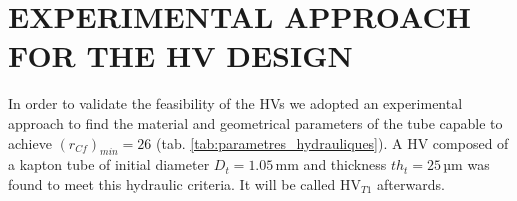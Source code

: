\documentclass[3p,twocolumn,preprint]{elsarticle}
\begin{document}
\section{EXPERIMENTAL APPROACH FOR THE HV \mbox{DESIGN}}
\label{sec:EXPERIMENTAL APPROACH FOR THE HV DESIGN}
In order to validate the feasibility of the HVs we adopted an experimental approach to find the material and geometrical parameters of the tube capable to achieve $(r_{Cf})_{min}=26$ (tab. \ref{tab:parametres_hydrauliques}). A HV composed of a kapton tube \cite{Dupont2012} of initial diameter $D_t=1.05$\,mm and thickness $th_t=25$\,µm was found to meet this hydraulic criteria. It will be called HV$_{T1}$ afterwards. 
\end{document}

